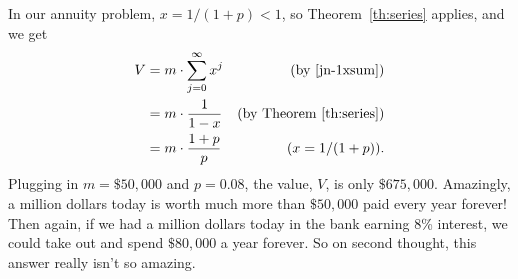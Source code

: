 In our annuity problem, $x=1/(1+p) < 1$, so Theorem~\ref{th:series}
applies, and we get
\begin{align*}
V & = m \cdot \sum_{j=0}^{\infty} x^j & \text{(by \eqref{jn-1xsum})}\\
  &= m\cdot \frac{1}{1-x} & \text{(by Theorem~\ref{th:series})}\\
  &= m\cdot \frac{1 + p}{p} &(x = 1/(1+p)).
\end{align*}
Plugging in $m = \$50,000$ and $p = 0.08$, the value, $V$, is only
$\$675,000$.  Amazingly, a million dollars today is worth much more than
$\$50,000$ paid every year forever!  Then again, if we had a million
dollars today in the bank earning 8\% interest, we could take out and
spend $\$80,000$ a year forever.  So on second thought, this answer really
isn't so amazing.

